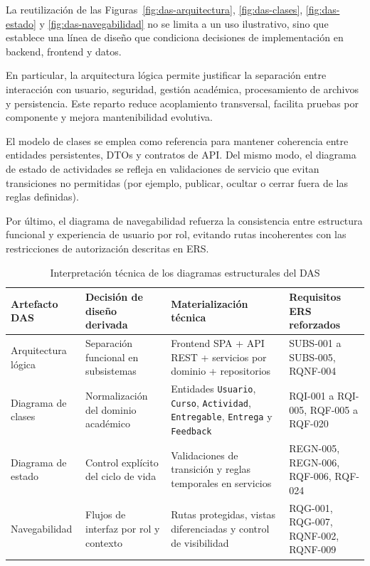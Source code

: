 La reutilizaci\'on de las Figuras~\ref{fig:das-arquitectura},
\ref{fig:das-clases}, \ref{fig:das-estado} y \ref{fig:das-navegabilidad}
no se limita a un uso ilustrativo, sino que establece una l\'inea de dise\~no
que condiciona decisiones de implementaci\'on en backend, frontend y datos.

En particular, la arquitectura l\'ogica permite justificar la separaci\'on entre
interacci\'on con usuario, seguridad, gesti\'on acad\'emica, procesamiento de
archivos y persistencia. Este reparto reduce acoplamiento transversal,
facilita pruebas por componente y mejora mantenibilidad evolutiva.

El modelo de clases se emplea como referencia para mantener coherencia entre
entidades persistentes, DTOs y contratos de API. Del mismo modo, el diagrama
de estado de actividades se refleja en validaciones de servicio que evitan
transiciones no permitidas (por ejemplo, publicar, ocultar o cerrar fuera de
las reglas definidas).

Por \'ultimo, el diagrama de navegabilidad refuerza la consistencia entre
estructura funcional y experiencia de usuario por rol, evitando rutas
incoherentes con las restricciones de autorizaci\'on descritas en ERS.

\begin{table}[!htbp]
\centering
\small
\begin{tabular}{|P{2.5cm}|P{3.6cm}|P{3.8cm}|P{2.4cm}|}
\hline
\textbf{Artefacto DAS} & \textbf{Decisi\'on de dise\~no derivada} & \textbf{Materializaci\'on t\'ecnica} & \textbf{Requisitos ERS reforzados} \\
\hline
Arquitectura l\'ogica & Separaci\'on funcional en subsistemas & Frontend SPA + API REST + servicios por dominio + repositorios & SUBS-001 a SUBS-005, RQNF-004 \\
\hline
Diagrama de clases & Normalizaci\'on del dominio acad\'emico & Entidades \texttt{Usuario}, \texttt{Curso}, \texttt{Actividad}, \texttt{Entregable}, \texttt{Entrega} y \texttt{Feedback} & RQI-001 a RQI-005, RQF-005 a RQF-020 \\
\hline
Diagrama de estado & Control expl\'icito del ciclo de vida & Validaciones de transici\'on y reglas temporales en servicios & REGN-005, REGN-006, RQF-006, RQF-024 \\
\hline
Navegabilidad & Flujos de interfaz por rol y contexto & Rutas protegidas, vistas diferenciadas y control de visibilidad & RQG-001, RQG-007, RQNF-002, RQNF-009 \\
\hline
\end{tabular}
\normalsize
\caption{Interpretaci\'on t\'ecnica de los diagramas estructurales del DAS}
\label{tab:das-lectura-estructural}
\end{table}

